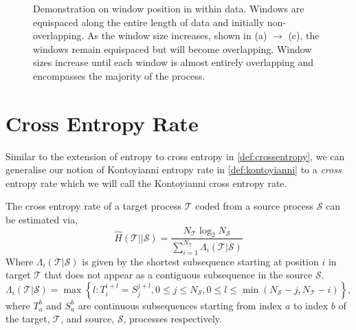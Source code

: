 \begin{figure}[hb]
	\caption{Demonstration on window position in within data. Windows are equispaced along the entire length of data and initially non-overlapping. As the window size increases, shown in (a) $\rightarrow$ (c), the windows remain equispaced but will become overlapping. Window sizes increase until each window is almost entirely overlapping and encompasses the majority of the process. }
\end{figure}


\section{Cross Entropy Rate}

Similar to the extension of entropy to cross entropy in \autoref{def:crossentropy}, we can generalise our notion of Kontoyianni entropy rate in \autoref{def:kontoyianni} to a \emph{cross} entropy rate which we will call the Kontoyianni cross entropy rate.

\begin{definition}
	The cross entropy rate of a {\color{target} target process} $\mathcal{T}$ coded from a {\color{source} source process} $\mathcal{S}$ can be estimated via,
	\begin{equation}
	\hat{H}(\mathcal{T} || \mathcal{S})=\frac{N_{\mathcal{T}} \log _{2} N_{\mathcal{S}}}{\sum_{i=1}^{N_{\mathcal{T}}} \Lambda_{i}(\mathcal{T}| \mathcal{S})}
	\end{equation}
	Where $\Lambda_{i}(\mathcal{T}| \mathcal{S})$ is given by the shortest subsequence starting at position $i$ in {\color{target}target} $\mathcal{T}$ that does not appear as a contiguous subsequence in the {\color{source}source} $\mathcal{S}$.
	\begin{equation}
	\Lambda_{i}(\mathcal{T}| \mathcal{S}) = \max \left\{l: T_i^{i+l}=S_{j}^{j+l}, 0 \leq j \leq N_{\mathcal{S}},  0 \leq l \leq \min( N_{\mathcal{S}}- j , N_{\mathcal{T}}- i )\right\},
	\end{equation}
	where $T_a^{b}$ and $S_a^b$ are continuous subsequences starting from index $a$ to index $b$ of the {\color{target} target}, $\mathcal{T}$, and  {\color{source} source}, $\mathcal{S}$, processes respectively.
\end{definition}

